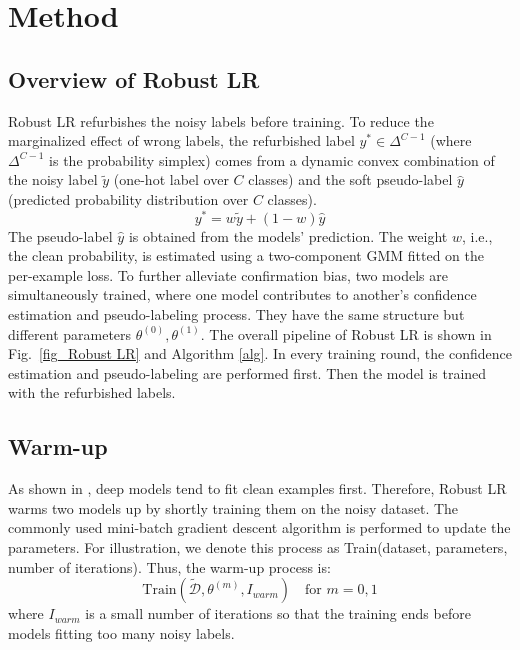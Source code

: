 \documentclass[letterpaper]{article} \usepackage{aaai23}  \usepackage{times}  \usepackage{helvet}  \usepackage{courier}  \usepackage[hyphens]{url}  \usepackage{graphicx} \urlstyle{rm} \def\UrlFont{\rm}  \usepackage{natbib}  \usepackage{caption} \frenchspacing  \setlength{\pdfpagewidth}{8.5in} \setlength{\pdfpageheight}{11in} \usepackage{algorithm}
\begin{document}
\section{Method}
\subsection{Overview of Robust LR}

Robust LR refurbishes the noisy labels before training.
To reduce the marginalized effect of wrong labels, the refurbished label $y^*\in  \Delta ^{C-1}$ (where $\Delta ^{C-1}$ is the probability simplex) comes from a dynamic convex combination of the noisy label $\tilde{y}$ (one-hot label over $C$ classes) and the soft pseudo-label $\hat{y}$ (predicted probability distribution over $C$ classes).
\begin{equation}  \label{refur_eq}
    y^*=w\tilde{y}+(1-w)\hat{y}
\end{equation}
The pseudo-label $\hat{y}$ is obtained from the models' prediction.
The weight $w$, i.e., the clean probability, is estimated using a two-component GMM fitted on the per-example loss.
To further alleviate confirmation bias, two models are simultaneously trained, where one model contributes to another's confidence estimation and pseudo-labeling process.
They have the same structure but different parameters $\theta^{(0)},\theta^{(1)}$.
The overall pipeline of Robust LR is shown in Fig.~\ref{fig_Robust LR} and Algorithm \ref{alg}. 
In every training round, the confidence estimation and pseudo-labeling are performed first. 
Then the model is trained with the refurbished labels. 

\subsection{Warm-up}
As shown in \cite{arpit2017closer}, deep models tend to fit clean examples first.
Therefore, Robust LR warms two models up by shortly training them on the noisy dataset. The commonly used mini-batch gradient descent algorithm is performed to update the parameters.
For illustration, we denote this process as Train(dataset, parameters, number of iterations). Thus, the warm-up process is:
\begin{equation} 
    \text{Train}(\tilde{\mathcal{D}},\theta^{(m)},I_{warm})\quad \text{for } m=0,1
\end{equation}
where $I_{warm}$ is a small number of iterations so that the training ends before models fitting too many noisy labels. 
\end{document}
